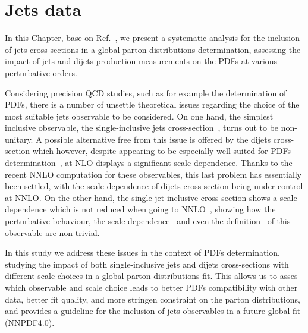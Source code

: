 \chapter{Jets data}
\label{ch:jets}
In this Chapter, base on Ref.~\cite{AbdulKhalek:2020jut}, we present a systematic analysis for the inclusion 
of jets cross-sections in a global parton distributions determination,
assessing the impact of jets and dijets production measurements on the PDFs at various perturbative orders.

%
Considering precision QCD studies, such as for example the determination of PDFs, 
there is a number of unsettle theoretical issues regarding the choice of the most suitable jets observable
to be considered. 
On one hand, the simplest inclusive observable, 
the single-inclusive jets cross-section~\cite{Ellis:1990ek,Aversa:1988fv}, turns out to be non-unitary.
A possible alternative free from this issue is offered by the dijets cross-section which however, despite appearing to be 
especially well suited for PDFs determination~\cite{Giele:1994xd}, at NLO displays a significant scale dependence. 
Thanks to the recent NNLO computation for these observables, this last problem has essentially been settled,
with the scale dependence of dijets cross-section being under control at NNLO.
On the other hand, the single-jet inclusive cross section
shows a scale dependence which is not reduced when going to NNLO~\cite{Currie:2017ctp}, 
showing how the perturbative behaviour, the scale dependence~\cite{Currie:2018xkj} and even the definition~\cite{Cacciari:2019qjx} 
of this observable are non-trivial.  

%
In this study we address these issues in the context of PDFs determination, studying the impact of both single-inclusive
jets and dijets cross-sections with different scale choices in a global parton distributions fit. 
This allows us to asses which observable and scale choice leads to better PDFs compatibility with other data, better fit quality,
and more stringen constraint on the parton distributions, and provides a guideline for the inclusion of jets observables in a future
global fit (NNPDF4.0).

